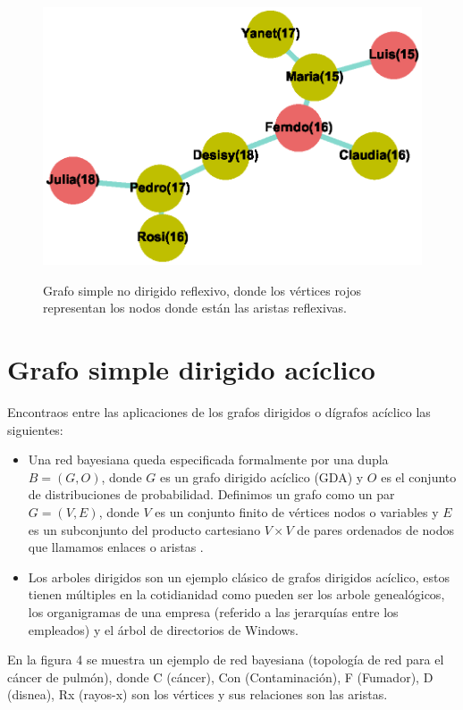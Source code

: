 \documentclass{article}
\begin{document}
  
  
\begin{center}

\end{center}
\begin{figure}[h]
\begin{center}
\includegraphics[scale=0.7]{Graf3_kamada_kawai_layout.eps}\\
\caption{Grafo simple no dirigido reflexivo, donde los vértices rojos representan los nodos donde están las aristas reflexivas.}
\end{center}
\end{figure}
\newpage
\section{Grafo simple dirigido acíclico}
Encontraos entre las aplicaciones de los grafos dirigidos o dígrafos acíclico las siguientes: 
\begin{itemize}
\item Una red bayesiana queda especificada formalmente por una dupla $B= (G, O)$, donde $G$ es un grafo dirigido acíclico (GDA) y $O$ es el conjunto de distribuciones de probabilidad. Definimos un grafo como un par $G= (V, E)$, donde $ V $ es un conjunto finito de vértices nodos o variables y $E$ es un subconjunto del producto cartesiano $V \times V $ de pares ordenados de nodos que llamamos enlaces o aristas \cite{gf2}.
\item Los arboles dirigidos son un ejemplo clásico de grafos dirigidos acíclico, estos tienen múltiples en la cotidianidad como pueden ser los arbole genealógicos, los organigramas de una empresa (referido a las jerarquías entre los empleados) y el árbol de directorios de Windows.

\end{itemize}	
En la figura 4 se muestra un ejemplo de red bayesiana (topología de red para el cáncer de pulmón), donde C (cáncer), Con (Contaminación), F (Fumador), D (disnea), Rx (rayos-x) son los vértices y sus relaciones son las aristas. 
\end{document}
